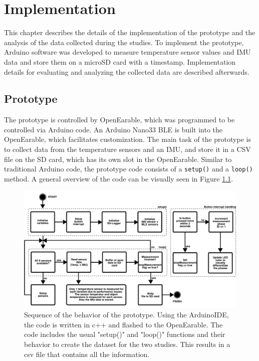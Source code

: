 \chapter{Implementation}
\label{ch:Implementation}
This chapter describes the details of the implementation of the prototype and the analysis of the data collected during the studies.
To implement the prototype, Arduino software was developed to measure temperature sensor values and IMU data and store them on a microSD card with a timestamp.
Implementation details for evaluating and analyzing the collected data are described afterwards.

\section{Prototype}
The prototype is controlled by OpenEarable, which was programmed to be controlled via Arduino code. 
An Arduino Nano33 BLE is built into the OpenEarable, which facilitates customization. 
The main task of the prototype is to collect data from the temperature sensors and an IMU, and store it in a CSV file on the SD card, which has its own slot in the OpenEarable. 
Similar to traditional Arduino code, the prototype code consists of a \texttt{setup()} and a \texttt{loop()} method.
A general overview of the code can be visually seen in Figure \ref{fig:ch:Implementation:ArduinoCodeProcedure}.

\begin{figure}[!t]
    \centering
    \includegraphics[width=\textwidth]{thesis-doc/images/ArduinoCodeProcedure.pdf}
    \caption{Sequence of the behavior of the prototype. Using the ArduinoIDE, the code is written in c++ and flashed to the OpenEarable. The code includes the usual "setup()" and "loop()" functions and their behavior to create the dataset for the two studies.
This results in a csv file that contains all the information.}
    \label{fig:ch:Implementation:ArduinoCodeProcedure}
\end{figure}

